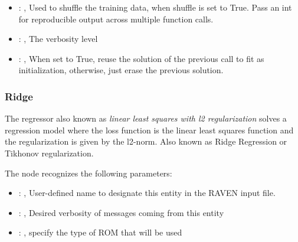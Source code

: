 \begin{itemize}
    \item {}: , 
      Used to shuffle the training data, when shuffle is set to
      True. Pass an int for reproducible output across multiple function calls.

    \item {}: , 
      The verbosity level

    \item {}: , 
      When set to True, reuse the solution of the previous call
      to fit as initialization, otherwise, just erase the previous solution.
  \end{itemize}


\subsubsection{Ridge}
  The  regressor also known as                              \textit{linear least
  squares with l2 regularization} solves a regression                              model where the
  loss function is the linear least squares function and the
  regularization is given by the l2-norm.                              Also known as Ridge
  Regression or Tikhonov regularization.

  The  node recognizes the following parameters:
    \begin{itemize}
      \item {}: , 
        User-defined name to designate this entity in the RAVEN input file.
      \item {}: , 
        Desired verbosity of messages coming from this entity
      \item {}: , 
        specify the type of ROM that will be used
  \end{itemize}

